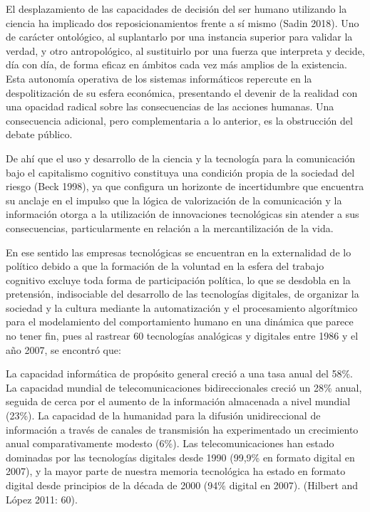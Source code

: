 \documentclass[
]{interact}
\begin{document}
El desplazamiento de las capacidades de decisión del ser humano
utilizando la ciencia ha implicado dos reposicionamientos frente a sí
mismo (Sadin 2018). Uno de carácter ontológico, al suplantarlo por una
instancia superior para validar la verdad, y otro antropológico, al
sustituirlo por una fuerza que interpreta y decide, día con día, de
forma eficaz en ámbitos cada vez más amplios de la existencia. Esta
autonomía operativa de los sistemas informáticos repercute en la
despolitización de su esfera económica, presentando el devenir de la
realidad con una opacidad radical sobre las consecuencias de las
acciones humanas. Una consecuencia adicional, pero complementaria a lo
anterior, es la obstrucción del debate público.

De ahí que el uso y desarrollo de la ciencia y la tecnología para la
comunicación bajo el capitalismo cognitivo constituya una condición
propia de la sociedad del riesgo (Beck 1998), ya que configura un
horizonte de incertidumbre que encuentra su anclaje en el impulso que la
lógica de valorización de la comunicación y la información otorga a la
utilización de innovaciones tecnológicas sin atender a sus
consecuencias, particularmente en relación a la mercantilización de la
vida.

En ese sentido las empresas tecnológicas se encuentran en la
externalidad de lo político debido a que la formación de la voluntad en
la esfera del trabajo cognitivo excluye toda forma de participación
política, lo que se desdobla en la pretensión, indisociable del
desarrollo de las tecnologías digitales, de organizar la sociedad y la
cultura mediante la automatización y el procesamiento algorítmico para
el modelamiento del comportamiento humano en una dinámica que parece no
tener fin, pues al rastrear 60 tecnologías analógicas y digitales entre
1986 y el año 2007, se encontró que:

La capacidad informática de propósito general creció a una tasa anual
del 58\%. La capacidad mundial de telecomunicaciones bidireccionales
creció un 28\% anual, seguida de cerca por el aumento de la información
almacenada a nivel mundial (23\%). La capacidad de la humanidad para la
difusión unidireccional de información a través de canales de
transmisión ha experimentado un crecimiento anual comparativamente
modesto (6\%). Las telecomunicaciones han estado dominadas por las
tecnologías digitales desde 1990 (99,9\% en formato digital en 2007), y
la mayor parte de nuestra memoria tecnológica ha estado en formato
digital desde principios de la década de 2000 (94\% digital en 2007).
(Hilbert and López 2011: 60).
\end{document}
